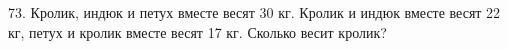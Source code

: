 73. Кролик, индюк и петух вместе весят 30 кг. Кролик и индюк вместе весят 22 кг, петух и кролик вместе весят 17 кг. Сколько весит кролик?\\
